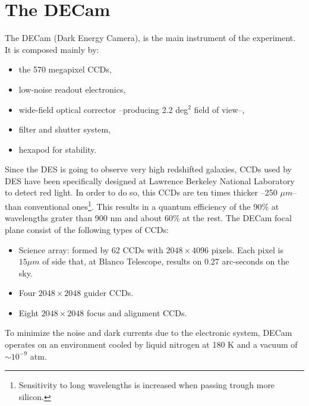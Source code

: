 \section{The DECam}
The DECam (Dark Energy Camera), is the main instrument of the experiment. It is composed mainly by:
\begin{itemize}
	\item the 570 megapixel CCDs,
    \item low-noise readout electronics,
    \item wide-field optical corrector --producing 2.2 deg$^2$ field of view--,
    \item filter and shutter system,
    \item hexapod for stability.   
\end{itemize}
Since the DES is going to observe very high redshifted galaxies, CCDs used by DES have been specifically designed at Lawrence Berkeley National Laboratory to detect red light. In order to do so, this CCDs are ten times thicker --250 $\mu m$-- than conventional ones\footnote{Sensitivity to long wavelengths is increased when passing trough more silicon.}. This results in a quantum efficiency of the 90\% at wavelengths grater than 900 nm and about 60\% at the rest. The DECam focal plane consist of the following types of CCDs:
\begin{itemize}
\item Science array: formed by 62 CCDs with $2048\times 4096$ pixels. Each pixel is $15\mu m$ of side that, at Blanco Telescope, results on 0.27 arc-seconds on the sky.
\item Four $2048\times2048$ guider CCDs.
\item Eight $2048\times 2048$ focus and alignment CCDs.
\end{itemize}
To minimize the noise and dark currents due to the electronic system, DECam operates on an environment cooled by liquid nitrogen at 180 K and a vacuum of $\sim 10^{-9}$ atm.
\newline

